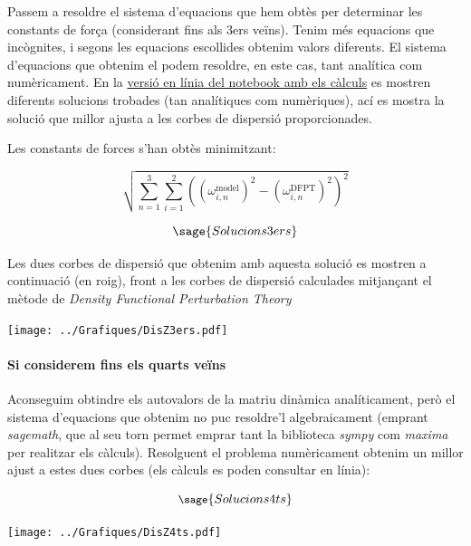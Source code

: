 \documentclass[12pt]{article} %
\begin{document}
Passem a resoldre el sistema d'equacions que hem obtès per determinar les constants de força (considerant fins als 3ers veïns).
Tenim més equacions que incògnites, i segons les equacions escollides obtenim valors diferents. El sistema d'equacions que obtenim el podem resoldre, en este cas, tant analítica com numèricament.
En la \href{https://casimirvictoria.github.io/TFG-Semiconductores_2D/index.html}{versió en línia del notebook amb els càlculs} es mostren diferents solucions trobades (tan analítiques com numèriques), ací es mostra la solució que millor ajusta a les corbes de dispersió proporcionades.

Les constants de forces s'han obtès minimitzant:

\begin{equation}
\sqrt{\sum_{n=1}^3\sum_{i=1}^2\left((\omega_{i,n}^\text{model})^2-(\omega_{i, n}^\text{DFPT})^2\right)^2}
\end{equation}


\begin{equation}
 \sage{Solucions3ers}
\end{equation}

Les dues corbes de dispersió que obtenim amb aquesta solució es mostren a continuació (en roig), front a les corbes de dispersió calculades mitjançant el mètode de \emph{Density Functional Perturbation Theory}

\begin{center}
\texttt{[image: ../Grafiques/DisZ3ers.pdf]}
\end{center}

\paragraph{Si considerem fins els quarts veïns}

Aconseguim obtindre els autovalors de la matriu dinàmica analíticament, però el sistema d'equacions que obtenim no puc resoldre'l algebraicament (emprant \textit{sagemath}, que al seu torn permet emprar tant la biblioteca \textit{sympy} com \textit{maxima} per realitzar els càlculs).  Resolguent el problema numèricament obtenim un millor ajust a estes dues corbes (els càlculs es poden consultar en línia):

\begin{equation}\small{
 \sage{Solucions4ts}}
\end{equation}

\begin{center}
\texttt{[image: ../Grafiques/DisZ4ts.pdf]}
\end{center}
\end{document}
